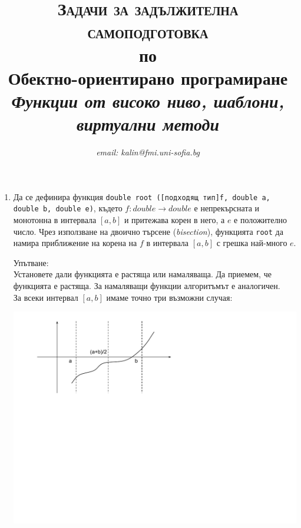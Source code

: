 \documentclass[12pt,a4paper]{article}
\author{\textit{email: kalin@fmi.uni-sofia.bg}}
\title{\textsc{Задачи за задължителна самоподготовка} \\
по \\
Обектно-ориентирано програмиране\\
\textit{Функции от високо ниво, шаблони, виртуални методи}}
\newcommand{\code}[1]{\texttt{#1}}
\begin{document}
\maketitle


\begin{enumerate}

	
	\item Да се дефинира функция \code{double root ([подходящ тип]f, double a, double b, double e)}, където
	 $f:double \rightarrow double$ е непрекърсната и монотонна в интервала $[a,b]$ и притежава корен в него, а $e$ е положително число. Чрез използване на двоично търсене (\textit{bisection}), функцията \code{root} да намира приближение на корена на $f$ в интервала $[a,b]$ с грешка най-много $e$.

	\begin{mdframed}[hidealllines=true,backgroundcolor=gray!20]
	Упътване:\\
	
	Установете дали функцията е растяща или намаляваща. Да приемем, че функцията е растяща. За намаляващи функции алгоритъмът е аналогичен. \\

	За всеки интервал $[a,b]$ имаме точно три възможни случая:\\

	\begin{center}
	\includegraphics[width=14.0cm]{images/function}
	\end{center}

	\vspace{-180px}



\end{mdframed}
\end{enumerate}
\end{document}
